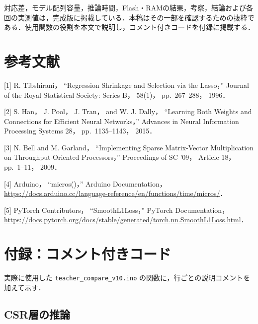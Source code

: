 \documentclass[
  10pt,
  a4paper,
]{article}
\begin{document}
対応差，モデル配列容量，推論時間，Flash・RAMの結果，考察，結論および各回の実測値は，完成版に掲載している．本稿はその一部を確認するための抜粋である．使用関数の役割を本文で説明し，コメント付きコードを付録に掲載する．

\section{参考文献}\label{ux53c2ux8003ux6587ux732e}

{[}1{]} R. Tibshirani， ``Regression Shrinkage and Selection via the
Lasso，'' Journal of the Royal Statistical Society: Series B， 58(1)，
pp.~267--288， 1996．

{[}2{]} S. Han， J. Pool， J. Tran， and W. J. Dally， ``Learning Both
Weights and Connections for Efficient Neural Networks，'' Advances in
Neural Information Processing Systems 28， pp.~1135--1143， 2015．

{[}3{]} N. Bell and M. Garland， ``Implementing Sparse Matrix-Vector
Multiplication on Throughput-Oriented Processors，'' Proceedings of SC
'09， Article 18， pp.~1--11， 2009．

{[}4{]} Arduino， ``micros()，'' Arduino Documentation，
\url{https://docs.arduino.cc/language-reference/en/functions/time/micros/}．

{[}5{]} PyTorch Contributors， ``SmoothL1Loss，'' PyTorch
Documentation，
\url{https://docs.pytorch.org/docs/stable/generated/torch.nn.SmoothL1Loss.html}．

\section{付録：コメント付きコード}\label{ux4ed8ux9332ux30b3ux30e1ux30f3ux30c8ux4ed8ux304dux30b3ux30fcux30c9}

実際に使用した \texttt{teacher\_compare\_v10.ino}
の関数に，行ごとの説明コメントを加えて示す．


\subsection{CSR層の推論}\label{csrux5c64ux306eux63a8ux8ad6}
\end{document}
